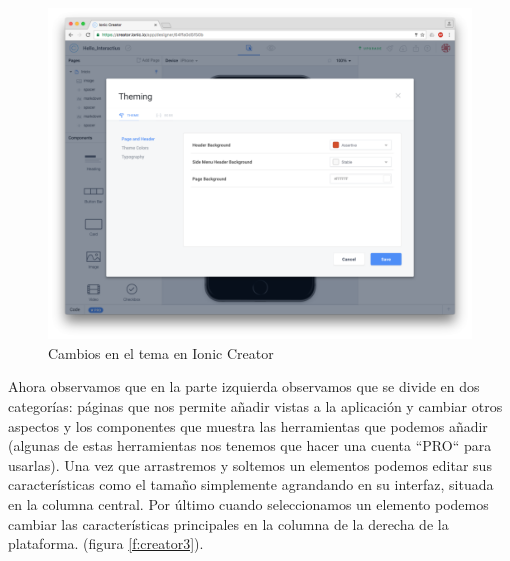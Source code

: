 \documentclass[a4paper, 11pt]{article}
\begin{document}
\begin{itemize}
               \begin{figure}[H]
                 \centering
                      \includegraphics[width=\textwidth]{creator2}
                      \caption{Cambios en el tema en Ionic Creator}
                      \label{f:creator2}
                \end{figure}

                Ahora observamos que en la parte izquierda observamos que se
                divide en dos categorías: páginas que nos permite añadir vistas
                a la aplicación y cambiar otros aspectos y los componentes que
                muestra las herramientas que podemos añadir (algunas de estas
                herramientas nos tenemos que hacer una cuenta ``PRO`` para
                usarlas). Una vez que arrastremos y soltemos un elementos podemos
                editar sus características como el tamaño simplemente agrandando
                en su interfaz, situada en la columna central. Por último cuando
                seleccionamos un elemento podemos cambiar las características
                principales en la columna de la derecha de la plataforma. (figura
                \ref{f:creator3}).\\


\end{itemize}
\end{document}
